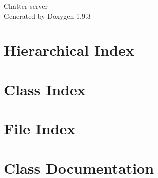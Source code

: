 \documentclass[twoside]{book}
\newcommand{\+}{\discretionary{\mbox{\scriptsize$\hookleftarrow$}}{}{}}
\newcommand{\clearemptydoublepage}{%
    \newpage{\pagestyle{empty}\cleardoublepage}%
  }
\begin{document}
  \raggedbottom
    \hypersetup{pageanchor=false,
                bookmarksnumbered=true,
                pdfencoding=unicode
               }
  \begin{titlepage}
  \vspace*{7cm}
  \begin{center}%
  {\Large Chatter server}\\
  \vspace*{1cm}
  {\large Generated by Doxygen 1.9.3}\\
  \end{center}
  \end{titlepage}
  \clearemptydoublepage
  \tableofcontents
  \clearemptydoublepage
  \hypersetup{pageanchor=true}
\chapter{Hierarchical Index}

\chapter{Class Index}

\chapter{File Index}

\chapter{Class Documentation}













\end{document}
